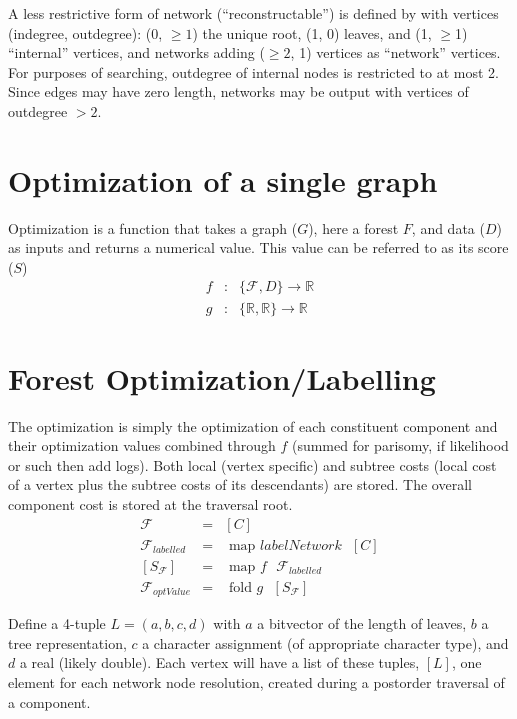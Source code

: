 \documentclass[11pt]{article}
\begin{document}
 A less restrictive form of network (``reconstructable'') is defined by \cite{moretetal2004} with vertices (indegree, outdegree): 
 (0, $\ge 1$) the unique root, (1, 0) leaves, and (1, $\ge$1) ``internal'' vertices, and 
 networks adding ($\ge 2$, 1) vertices as ``network'' vertices.  For purposes of searching,
 outdegree of internal nodes is restricted to at most 2. Since edges may have zero length, networks may be output 
 with vertices of outdegree $> 2$.
 
 \section{Optimization of a single graph}\label{Optimization of a single graph}
 Optimization is a function that takes a graph ($G$), here a forest $F$, and data ($D$) as inputs and returns a numerical value.  
 This value can be referred to as its score ($S$)
 	\begin{eqnarray*}
 		f & : &  \{\mathcal{F}, D\} \rightarrow \mathbb{R}\\
		g & : & \{  \mathbb{R},  \mathbb{R} \} \rightarrow \mathbb{R}
	 \end{eqnarray*}
 
 \section{Forest Optimization/Labelling}\label{Forest Optimization/Labelling}
 The optimization is simply the optimization of each constituent component and their optimization values 
 combined through $f$ (summed for parisomy, if likelihood or such then add logs).  Both local (vertex  specific) and subtree costs (local cost of a vertex plus
 the subtree costs of its descendants) are stored.  The overall component cost is stored at the traversal root.
     \begin{eqnarray*}
     	\mathcal{F} & = & [C]\\
	\mathcal{F}_{labelled} & = & \text{ map } labelNetwork \text{ } [C]\\
	\left[ S_{\mathcal{F}} \right] &=& \text{ map } f \text{ } \mathcal{F}_{labelled}\\
	\mathcal{F}_{optValue} &=& \text{ fold } g \text{ } \left[ S_{\mathcal{F}} \right] 
    \end{eqnarray*}
 
 Define a 4-tuple $L = (a, b, c, d)$ with $a$ a bitvector of the length of leaves, $b$ a tree representation, $c$ a 
 character assignment (of appropriate character type), and $d$ a real (likely double). Each vertex will have a list of these
 tuples, $\left[L\right]$, one element for each network node resolution, created during a postorder traversal of a component.
 
\end{document}
